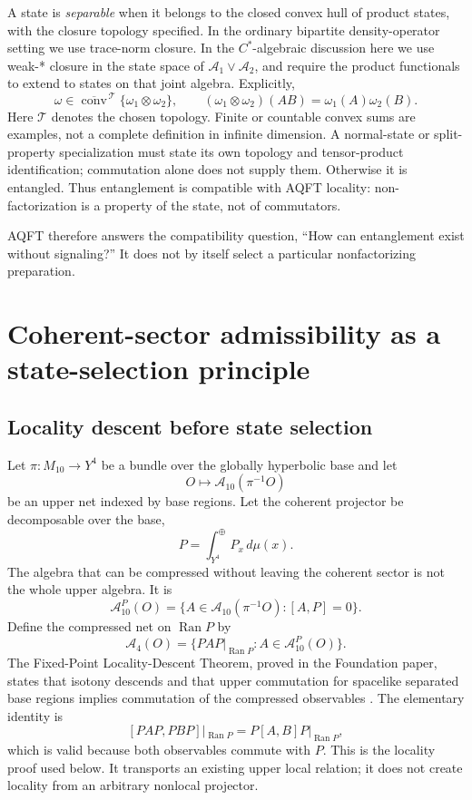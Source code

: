 \documentclass[11pt]{article}
\begin{document}
A state is \emph{separable} when it belongs to the closed convex hull of
product states, with the closure topology specified. In the ordinary
bipartite density-operator setting we use trace-norm closure. In the
$C^*$-algebraic discussion here we use weak-* closure in the state space
of $\mathcal{A}_1\vee\mathcal{A}_2$, and require the product functionals
to extend to states on that joint algebra. Explicitly,
\begin{equation}\label{eq:separable}
 \omega\in\overline{\operatorname{conv}}^{\,\mathcal T}
 \{\omega_1\otimes\omega_2\},
 \qquad (\omega_1\otimes\omega_2)(AB)=\omega_1(A)\omega_2(B).
\end{equation}
Here $\mathcal T$ denotes the chosen topology. Finite or countable convex
sums are examples, not a complete definition in infinite dimension. A
normal-state or split-property specialization must state its own topology
and tensor-product identification; commutation alone does not supply them.
Otherwise it is entangled. Thus entanglement is compatible with AQFT locality:
non-factorization is a property of the state, not of commutators.

AQFT therefore answers the compatibility question, ``How can entanglement
exist without signaling?''  It does not by itself select a particular
nonfactorizing preparation.

\section{Coherent-sector admissibility as a state-selection principle}

\subsection{Locality descent before state selection}

Let $\pi:M_{10}\to Y^4$ be a bundle over the globally hyperbolic base and
let
\[
 O\longmapsto\mathcal A_{10}(\pi^{-1}O)
\]
be an upper net indexed by base regions.  Let the coherent projector be
decomposable over the base,
\[
 P=\int_{Y^4}^{\oplus}P_x\,d\mu(x).
\]
The algebra that can be compressed without leaving the coherent sector is
not the whole upper algebra.  It is
\[
 \mathcal A_{10}^{P}(O)
 =\{A\in\mathcal A_{10}(\pi^{-1}O):[A,P]=0\}.
\]
Define the compressed net on $\operatorname{Ran}P$ by
\[
 \mathcal A_4(O)
 =\{PAP|_{\operatorname{Ran}P}:A\in\mathcal A_{10}^{P}(O)\}.
\]
The Fixed-Point Locality-Descent Theorem, proved in the Foundation paper,
states that isotony descends and that upper commutation for spacelike
separated base regions implies commutation of the compressed observables
\cite{MTTFoundation}.  The elementary identity is
\[
 [PAP,PBP]|_{\operatorname{Ran}P}
 =P[A,B]P|_{\operatorname{Ran}P},
\]
which is valid because both observables commute with $P$.  This is the
locality proof used below.  It transports an existing upper local relation;
it does not create locality from an arbitrary nonlocal projector.
\end{document}
